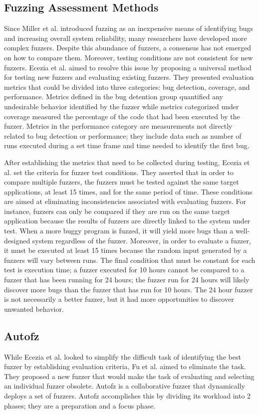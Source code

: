 \subsection{Fuzzing Assessment Methods}
Since Miller et al. introduced fuzzing as an inexpensive means of identifying bugs 
and increasing overall system reliability, many researchers have developed more 
complex fuzzers. Despite this abundance of fuzzers, a consensus has not emerged 
on how to compare them. Moreover, testing conditions are not consistent for new fuzzers. 
Ecezia et al. aimed to resolve this issue by proposing a universal method for testing new 
fuzzers and evaluating existing fuzzers. They presented evaluation metrics that could be 
divided into three categories: bug detection, coverage, and performance. Metrics defined 
in the bug detention group quantified any undesirable behavior identified by the fuzzer 
while metrics categorized under coverage measured the percentage of the code that had 
been executed by the fuzzer. Metrics in the performance category are measurements not 
directly related to bug detection or performance; they include data such as number of 
runs executed during a set time frame and time needed to identify the first bug.

After establishing the metrics that need to be collected during testing, Ecezia et al. 
set the criteria for fuzzer test conditions. They asserted that in order to compare 
multiple fuzzers, the fuzzers must be tested against the same target applications, at 
least 15 times, and for the same period of time. These conditions are aimed at eliminating 
inconsistencies associated with evaluating fuzzers. For instance, fuzzers can only be 
compared if they are run on the same target application because the results of fuzzers 
are directly linked to the system under test. When a more buggy program is fuzzed, it 
will yield more bugs than a well-designed system regardless of the fuzzer. Moreover, 
in order to evaluate a fuzzer, it must be executed at least 15 times because the random 
input generated by a fuzzers will vary between runs. The final condition that must be 
constant for each test is execution time; a fuzzer executed for 10 hours cannot be 
compared to a fuzzer that has been running for 24 hours; the fuzzer run for 24 hours 
will likely discover more bugs than the fuzzer that has run for 10 hours. The 24 hour 
fuzzer is not necessarily a better fuzzer, but it had more opportunities to discover 
unwanted behavior. \cite{Ecezia}

\subsection{Autofz}
While Ecezia et al. looked to simplify the difficult task of identifying the best 
fuzzer by establishing evaluation criteria, Fu et al. aimed to eliminate the task. 
They proposed a new fuzzer that would make the task of evaluating and selecting an 
individual fuzzer obsolete. Autofz is a collaborative fuzzer that dynamically deploys 
a set of fuzzers. Autofz accomplishes this by dividing its workload into 2 phases; 
they are a preparation and a focus phase. 

